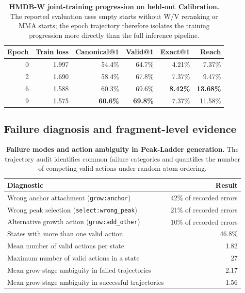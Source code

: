 \begin{table}[!htbp]
\centering
\caption{\textbf{HMDB-W joint-training progression on held-out Calibration.}
The reported evaluation uses empty starts without W/V reranking or MMA starts;
the epoch trajectory therefore isolates the training progression more directly
than the full inference pipeline.}
\label{tab:hmdbw_epoch_progression}
\small
\setlength{\tabcolsep}{3pt}

\begin{tabular}{@{}rrrrrr@{}}
\toprule
Epoch & Train loss & Canonical@1 & Valid@1 & Exact@1 & Reach \\
\midrule
0 & 1.997 & 54.4\% & 64.7\% & 4.21\% & 7.37\% \\
2 & 1.690 & 58.4\% & 67.8\% & 7.37\% & 9.47\% \\
6 & 1.588 & 60.3\% & 69.6\% & \textbf{8.42\%} & \textbf{13.68\%} \\
9 & 1.575 & \textbf{60.6\%} & \textbf{69.8\%} & 7.37\% & 11.58\% \\
\bottomrule
\end{tabular}
\end{table}

\subsection{Failure diagnosis and fragment-level evidence}

\begin{table}[!htbp]
\centering
\caption{\textbf{Failure modes and action ambiguity in Peak-Ladder generation.}
The trajectory audit identifies common failure categories and quantifies the
number of competing valid actions under random atom ordering.}
\label{tab:ladder_failure_modes}
\small
\begin{tabular}{lr}
\toprule
Diagnostic & Result \\
\midrule
Wrong anchor attachment (\texttt{grow:anchor}) & 42\% of recorded errors \\
Wrong peak selection (\texttt{select:wrong\_peak}) & 21\% of recorded errors \\
Alternative growth action (\texttt{grow:add\_other}) & 10\% of recorded errors \\
States with more than one valid action & 46.8\% \\
Mean number of valid actions per state & 1.82 \\
Maximum number of valid actions in a state & 27 \\
Mean grow-stage ambiguity in failed trajectories & 2.17 \\
Mean grow-stage ambiguity in successful trajectories & 1.56 \\
\bottomrule
\end{tabular}
\end{table}


